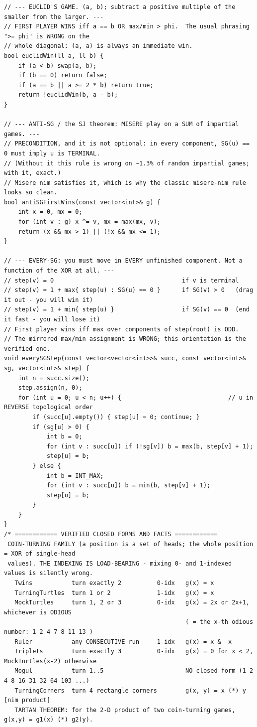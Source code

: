 \documentclass[9pt,a4paper,twocolumn]{extarticle}
\begin{document}
\begin{lstlisting}
// --- EUCLID'S GAME. (a, b); subtract a positive multiple of the smaller from the larger. ---
// FIRST PLAYER WINS iff a == b OR max/min > phi.  The usual phrasing ">= phi" is WRONG on the
// whole diagonal: (a, a) is always an immediate win.
bool euclidWin(ll a, ll b) {
    if (a < b) swap(a, b);
    if (b == 0) return false;
    if (a == b || a >= 2 * b) return true;
    return !euclidWin(b, a - b);
}

// --- ANTI-SG / the SJ theorem: MISERE play on a SUM of impartial games. ---
// PRECONDITION, and it is not optional: in every component, SG(u) == 0 must imply u is TERMINAL.
// (Without it this rule is wrong on ~1.3% of random impartial games; with it, exact.)
// Misere nim satisfies it, which is why the classic misere-nim rule looks so clean.
bool antiSGFirstWins(const vector<int>& g) {
    int x = 0, mx = 0;
    for (int v : g) x ^= v, mx = max(mx, v);
    return (x && mx > 1) || (!x && mx <= 1);
}

// --- EVERY-SG: you must move in EVERY unfinished component. Not a function of the XOR at all. ---
// step(v) = 0                                    if v is terminal
// step(v) = 1 + max{ step(u) : SG(u) == 0 }      if SG(v) > 0   (drag it out - you will win it)
// step(v) = 1 + min{ step(u) }                   if SG(v) == 0  (end it fast - you will lose it)
// First player wins iff max over components of step(root) is ODD.
// The mirrored max/min assignment is WRONG; this orientation is the verified one.
void everySGStep(const vector<vector<int>>& succ, const vector<int>& sg, vector<int>& step) {
    int n = succ.size();
    step.assign(n, 0);
    for (int u = 0; u < n; u++) {                              // u in REVERSE topological order
        if (succ[u].empty()) { step[u] = 0; continue; }
        if (sg[u] > 0) {
            int b = 0;
            for (int v : succ[u]) if (!sg[v]) b = max(b, step[v] + 1);
            step[u] = b;
        } else {
            int b = INT_MAX;
            for (int v : succ[u]) b = min(b, step[v] + 1);
            step[u] = b;
        }
    }
}
/* ============ VERIFIED CLOSED FORMS AND FACTS ============
 COIN-TURNING FAMILY (a position is a set of heads; the whole position = XOR of single-head
 values). THE INDEXING IS LOAD-BEARING - mixing 0- and 1-indexed values is silently wrong.
   Twins           turn exactly 2          0-idx   g(x) = x
   TurningTurtles  turn 1 or 2             1-idx   g(x) = x
   MockTurtles     turn 1, 2 or 3          0-idx   g(x) = 2x or 2x+1, whichever is ODIOUS
                                                   ( = the x-th odious number: 1 2 4 7 8 11 13 )
   Ruler           any CONSECUTIVE run     1-idx   g(x) = x & -x
   Triplets        turn exactly 3          0-idx   g(x) = 0 for x < 2, MockTurtles(x-2) otherwise
   Mogul           turn 1..5                       NO closed form (1 2 4 8 16 31 32 64 103 ...)
   TurningCorners  turn 4 rectangle corners        g(x, y) = x (*) y     [nim product]
   TARTAN THEOREM: for the 2-D product of two coin-turning games, g(x,y) = g1(x) (*) g2(y).


\end{lstlisting}
\end{document}
